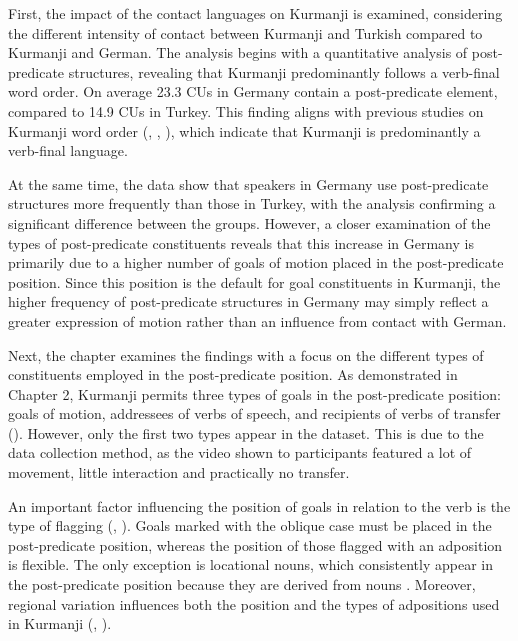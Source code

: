 First, the impact of the contact languages on Kurmanji is examined, considering the different intensity of contact between Kurmanji and Turkish compared to Kurmanji and German. The analysis begins with a quantitative analysis of post-predicate structures, revealing that Kurmanji predominantly follows a verb-final word order. On average 23.3 CUs in Germany contain a post-predicate element, compared to 14.9 CUs in Turkey. This finding aligns with previous studies on Kurmanji word order (\citealt{Haig2014}, \citealt{HaigThiele2014, Gundogdu2019}, \citealt{HaigEtAl2024}), which indicate that Kurmanji is predominantly a verb-final language.

At the same time, the data show that speakers in Germany use post-predicate structures more frequently than those in Turkey, with the analysis confirming a significant difference between the groups. However, a closer examination of the types of post-predicate constituents reveals that this increase in Germany is primarily due to a higher number of goals of motion placed in the post-predicate position. Since this position is the default for goal constituents in Kurmanji, the higher frequency of post-predicate structures in Germany may simply reflect a greater expression of motion rather than an influence from contact with German.

Next, the chapter examines the findings with a focus on the different types of constituents employed in the post-predicate position. As demonstrated in Chapter 2, Kurmanji permits three types of goals in the post-predicate position: goals of motion, addressees of verbs of speech, and recipients of verbs of transfer (\citealt{Haig2014, Gundogdu2019}). However, only the first two types appear in the dataset. This is due to the data collection method, as the video shown to participants featured a lot of movement, little interaction and practically no transfer.

An important factor influencing the position of goals in relation to the verb is the type of flagging (\citealt{Haig2014}, \citealt{HaigThiele2014, Gundogdu2019}). Goals marked with the oblique case must be placed in the post-predicate position, whereas the position of those flagged with an adposition is flexible. The only exception is locational nouns, which consistently appear in the post-predicate position because they are derived from nouns \citep{Haig2014}. Moreover, regional variation influences both the position and the types of adpositions used in Kurmanji (\citealt{Haig2014}, \citealt{Haig2022}).

